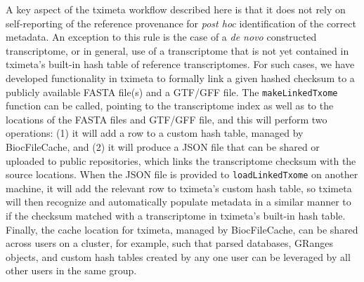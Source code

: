 A key aspect of the tximeta workflow described here is that it does
not rely on self-reporting of the reference provenance for
\textit{post hoc} identification of the correct metadata. An exception
to this rule is the case of a \textit{de novo} constructed
transcriptome, or in general, use of a transcriptome that is not yet
contained in tximeta's built-in hash table of reference
transcriptomes. For such cases, we have developed functionality in
tximeta to formally link a given hashed checksum to a publicly
available FASTA file(s) and a GTF/GFF file. The
\texttt{makeLinkedTxome} function can be called, pointing to the
transcriptome index as well as to the locations of the FASTA files and
GTF/GFF file, and this will perform two operations:
(1) it will add a row to a custom hash
table, managed by BiocFileCache, and (2) it will produce a JSON file
that can be shared or uploaded to public repositories,
which links the transcriptome checksum
with the source locations. When the JSON file is provided to
\texttt{loadLinkedTxome} on another machine, it will add the relevant
row to tximeta's custom hash table, so tximeta will then recognize and
automatically populate metadata in a similar manner to if the checksum
matched with a transcriptome in tximeta's built-in hash
table. Finally, the cache location for tximeta, managed by
BiocFileCache, can be shared across users on a cluster, for example,
such that parsed databases, GRanges objects, and custom hash tables
created by any one user can be leveraged by all other users in the
same group.

